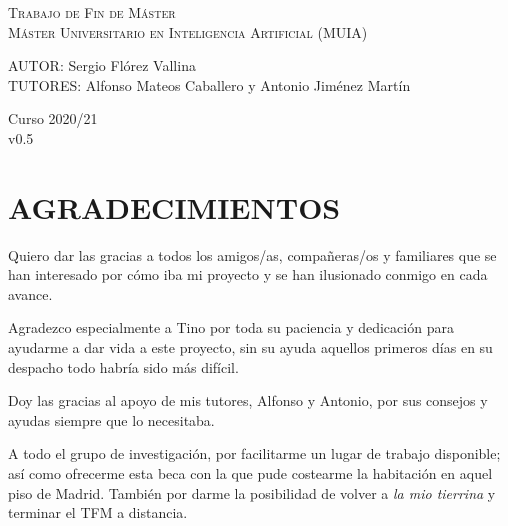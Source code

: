 \documentclass[spanish,12pt, a4paper,twoside]{article}
\let\oldsection\section
\def\section{\cleardoublepage\oldsection}
\newcommand\blankpage{
    \null
    \thispagestyle{empty}
    \addtocounter{page}{-1}
    \newpage
}
\begin{document}
\begin{titlepage}
        \textsc{\LARGE Trabajo de Fin de Máster}\\[0.5cm]
        \textsc{\large Máster Universitario en Inteligencia Artificial (MUIA) }\\[2.5cm]

        \begin{flushright}
            \large
            AUTOR: Sergio Flórez Vallina\\
            TUTORES: Alfonso Mateos Caballero y \linebreak
            Antonio Jiménez Martín
        \end{flushright}

        \vspace{1.3cm}

        { 
        	{Curso 2020/21}%
    	}\\[0.8cm]
    
        {
            {v0.5}
        }

                    

        \vfill

    \end{titlepage}

    \afterpage{\blankpage}


    \section*{AGRADECIMIENTOS}
    Quiero dar las gracias a todos los amigos/as, compañeras/os y familiares que se han interesado por cómo iba mi proyecto y se han ilusionado conmigo en cada avance. 
    
    Agradezco especialmente a Tino por toda su paciencia y dedicación para ayudarme
    a dar vida a este proyecto, sin su ayuda aquellos primeros días en su despacho todo habría sido más difícil. 
    
    Doy las gracias al apoyo de mis tutores, Alfonso y Antonio, por sus consejos y ayudas siempre que lo necesitaba.
    
    A todo el grupo de investigación, por facilitarme un lugar de trabajo disponible; así como ofrecerme esta beca con la que pude costearme la habitación en aquel piso de Madrid. También por darme la posibilidad de volver a \textit{la mio tierrina} y terminar el TFM a distancia.
    
\end{document}
